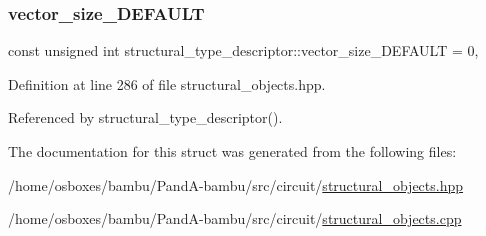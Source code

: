 \subsubsection{\texorpdfstring{vector\+\_\+size\+\_\+\+D\+E\+F\+A\+U\+LT}{vector\_size\_DEFAULT}}
{\footnotesize\ttfamily const unsigned int structural\+\_\+type\+\_\+descriptor\+::vector\+\_\+size\+\_\+\+D\+E\+F\+A\+U\+LT = 0\hspace{0.3cm}{\ttfamily [static]}, {\ttfamily [private]}}



Definition at line 286 of file structural\+\_\+objects.\+hpp.



Referenced by structural\+\_\+type\+\_\+descriptor().



The documentation for this struct was generated from the following files\+:\begin{DoxyCompactItemize}
\item 
/home/osboxes/bambu/\+Pand\+A-\/bambu/src/circuit/\hyperlink{structural__objects_8hpp}{structural\+\_\+objects.\+hpp}\item 
/home/osboxes/bambu/\+Pand\+A-\/bambu/src/circuit/\hyperlink{structural__objects_8cpp}{structural\+\_\+objects.\+cpp}\end{DoxyCompactItemize}
